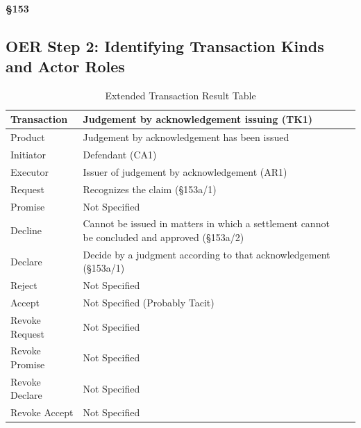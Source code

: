 \paragraph{\S 153}

\begin{landscape}
\section{OER Step 2: Identifying Transaction Kinds and Actor Roles}

\begin{table}[h]
\caption{Extended Transaction Result Table}
\label{tab:etrt}
\begin{tabular}{|l||l|l|}
\hline
Transaction  & Judgement by acknowledgement issuing (TK1) \\ \hline
Product      & Judgement by acknowledgement has been issued   \\ \hline
Initiator      & Defendant (CA1) \\ \hline
Executor       & Issuer of judgement by acknowledgement (AR1)      \\ \hline
Request        & Recognizes the claim (\S153a/1)   \\ \hline
Promise        & Not Specified   \\ \hline
Decline        &  Cannot be issued in matters in which a settlement cannot be concluded and approved  (\S153a/2)  \\ \hline
Declare        & Decide by a judgment according to that acknowledgement (\S153a/1)  \\ \hline
Reject         &  Not Specified   \\ \hline
Accept         & Not Specified (Probably Tacit) \\ \hline
Revoke Request & Not Specified \\ \hline
Revoke Promise & Not Specified \\ \hline
Revoke Declare & Not Specified  \\ \hline
Revoke Accept  &  Not Specified   \\ \hline
\end{tabular}
\end{table}


\end{landscape}
